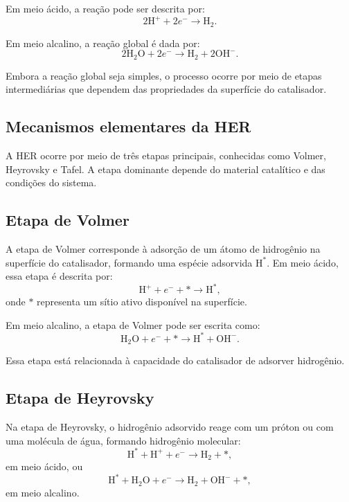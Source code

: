 Em meio ácido, a reação pode ser descrita por:
\begin{equation}
2\mathrm{H}^+ + 2e^- \rightarrow \mathrm{H_2}.
\end{equation}

Em meio alcalino, a reação global é dada por:
\begin{equation}
2\mathrm{H_2O} + 2e^- \rightarrow \mathrm{H_2} + 2\mathrm{OH}^-.
\end{equation}

Embora a reação global seja simples, o processo ocorre por meio de etapas intermediárias que dependem das propriedades da superfície do catalisador.

\subsection{Mecanismos elementares da HER}

A HER ocorre por meio de três etapas principais, conhecidas como Volmer, Heyrovsky e Tafel. A etapa dominante depende do material catalítico e das condições do sistema.

\subsection{Etapa de Volmer}

A etapa de Volmer corresponde à adsorção de um átomo de hidrogênio na superfície do catalisador, formando uma espécie adsorvida \(\mathrm{H^*}\). Em meio ácido, essa etapa é descrita por:
\begin{equation}
\mathrm{H}^+ + e^- + * \rightarrow \mathrm{H^*},
\end{equation}
onde \( * \) representa um sítio ativo disponível na superfície.

Em meio alcalino, a etapa de Volmer pode ser escrita como:
\begin{equation}
\mathrm{H_2O} + e^- + * \rightarrow \mathrm{H^*} + \mathrm{OH}^-.
\end{equation}

Essa etapa está relacionada à capacidade do catalisador de adsorver hidrogênio.

\subsection{Etapa de Heyrovsky}

Na etapa de Heyrovsky, o hidrogênio adsorvido reage com um próton ou com uma molécula de água, formando hidrogênio molecular:
\begin{equation}
\mathrm{H^*} + \mathrm{H}^+ + e^- \rightarrow \mathrm{H_2} + *,
\end{equation}
em meio ácido, ou
\begin{equation}
\mathrm{H^*} + \mathrm{H_2O} + e^- \rightarrow \mathrm{H_2} + \mathrm{OH}^- + *,
\end{equation}
em meio alcalino.

